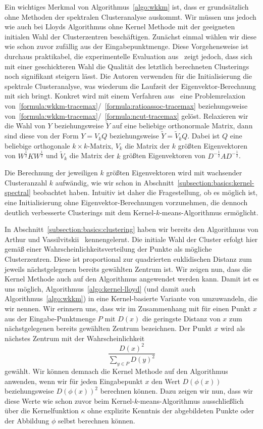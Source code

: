 Ein wichtiges Merkmal von Algorithmus~\ref{algo:wkkm} ist, dass er grundsätzlich ohne Methoden der spektralen Clusteranalyse
auskommt. Wir müssen uns jedoch wie auch bei Lloyds Algorithmus ohne Kernel Methode mit der geeigneten initialen Wahl
der Clusterzentren beschäftigen. Zunächst einmal wählen wir diese wie schon zuvor zufällig aus der Eingabepunktmenge.
Diese Vorgehensweise ist durchaus praktikabel, die experimentelle Evaluation aus~\citep{DhillonGK04,DhillonGK07} zeigt jedoch,
dass sich mit einer geschickteren Wahl die Qualität des letztlich berechneten Clusterings noch signifikant steigern lässt.
Die Autoren verwenden für die Initialisierung die spektrale Clusteranalyse, was wiederum die Laufzeit der Eigenvektor-Berechnung
mit sich bringt.
\absatz
Konkret wird mit einem Verfahren aus~\cite{GolubL96} eine Problemrelaxion
von~\ref{formula:wkkm-tracemax}/~\ref{formula:ratioassoc-tracemax} beziehungsweise
von~\ref{formula:wkkm-tracemax}/~\ref{formula:ncut-tracemax} gelöst.
Relaxieren wir die Wahl von $Y$ beziehungsweise $\tilde{Y}$ auf eine beliebige
orthonormale Matrix, dann sind diese von der Form $Y = V_k Q$ beziehungsweise $\tilde{Y} = \tilde{V}_k Q$.
Dabei ist $Q$ eine beliebige orthogonale $k \times k$-Matrix, $V_k$ die Matrix der $k$ größten Eigenvektoren von
$W^{\frac{1}{2}} K W^{\frac{1}{2}}$ und $\tilde{V}_k$ die Matrix der $k$ größten Eigenvektoren von
$D^{-\frac{1}{2}} A D^{-\frac{1}{2}}$.

Die Berechnung der jeweiligen $k$ größten Eigenvektoren wird mit wachsender Clusteranzahl
$k$ aufwändig, wie wir schon in Abschnitt~\ref{subsection:basics:kernel-spectral} beobachtet haben.
Intuitiv ist daher die Fragestellung, ob es möglich ist, eine Initialisierung ohne Eigenvektor-Berechnungen vorzunehmen,
die dennoch deutlich verbesserte Clusterings mit dem Kernel-$k$-means-Algorithmus ermöglicht.

In Abschnitt~\ref{subsection:basics:clustering} haben wir bereits den Algorithmus \kmpp{} von Arthur und
Vassilvitskii~\cite{ArthurV07} kennengelernt. Die initiale Wahl der Cluster erfolgt hier gemäß einer
Wahrscheinlichkeitsverteilung der Punkte als mögliche Clusterzentren. Diese ist proportional zur quadrierten euklidischen Distanz
zum jeweils nächstgelegenen bereits gewählten Zentrum ist. Wir zeigen nun, dass die Kernel Methode auch auf den Algorithmus
\kmpp{} angewendet werden kann. Damit ist es uns möglich, Algorithmus~\ref{algo:kernel-lloyd} (und damit
auch Algorithmus~\ref{algo:wkkm}) in eine Kernel-basierte Variante von \kmpp{} umzuwandeln, die wir \kkmpp{} nennen.
\absatz
Wir erinnern uns, dass wir im Zusammenhang mit \kmpp{} für einen Punkt $x$ aus der Eingabe-Punktmenge $P$ mit $D(x)$
die geringste Distanz von $x$ zum nächstgelegenen bereits gewählten Zentrum bezeichnen. Der Punkt $x$ wird als nächstes
Zentrum mit der Wahrscheinlichkeit
\[ \frac{D(x)^2}{\sum_{y \in P} D(y)^2} \]
gewählt. Wir können demnach die Kernel Methode auf den Algorithmus \kmpp{} anwenden, wenn wir für jeden Eingabepunkt $x$ den
Wert $D(\phi(x))$ beziehungsweise $D(\phi(x))^2$ berechnen können. Dazu zeigen wir nun, dass wir diese Werte wie schon zuvor
beim Kernel-$k$-means-Algorithmus ausschließlich über die Kernelfunktion $\kappa$ ohne explizite Kenntnis der abgebildeten
Punkte oder der Abbildung $\phi$ selbst berechnen können.

